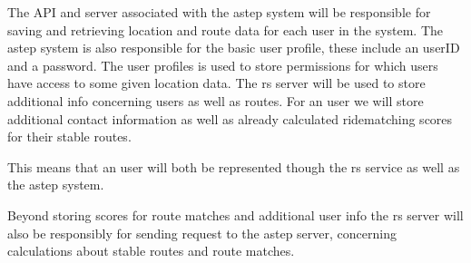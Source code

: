 The API and server associated with the \gls{astep} system will be responsible for saving and retrieving location and route data for each user in the system.
The \gls{astep} system is also responsible for the basic user profile, these include an userID and a password.
The user profiles is used to store permissions for which users have access to some given location data.
The \gls{rs} server will be used to store additional info concerning users as well as routes.
For an user we will store additional contact information as well as already calculated ridematching scores for their stable routes. 

This means that an user will both be represented though the \gls{rs} service as well as the \gls{astep} system. 



Beyond storing scores for route matches and additional user info the \gls{rs} server will also be responsibly for sending request to the \gls{astep} server, concerning calculations about stable routes and route matches.
